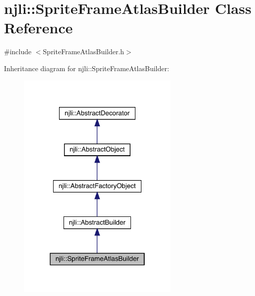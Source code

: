 \hypertarget{classnjli_1_1_sprite_frame_atlas_builder}{}\section{njli\+:\+:Sprite\+Frame\+Atlas\+Builder Class Reference}
\label{classnjli_1_1_sprite_frame_atlas_builder}


{\ttfamily \#include $<$Sprite\+Frame\+Atlas\+Builder.\+h$>$}



Inheritance diagram for njli\+:\+:Sprite\+Frame\+Atlas\+Builder\+:\nopagebreak
\begin{figure}[H]
\begin{center}
\leavevmode
\includegraphics[width=222pt]{classnjli_1_1_sprite_frame_atlas_builder__inherit__graph}
\end{center}
\end{figure}


